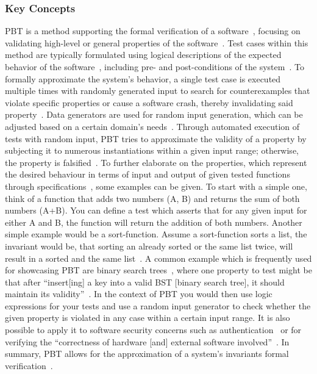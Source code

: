\documentclass[runningheads]{llncs}
\begin{document}
\subsubsection{Key Concepts}
PBT is a method supporting the formal verification of a software~\cite{Chen2022,Fink1997,Honarvar2020,Paraskevopoulou2015}, focusing on validating high-level or general properties of the software~\cite{Fink1997,Honarvar2020,Corgozinho2023}. Test cases within this method are typically formulated using logical descriptions of the expected behavior of the software~\cite{Chen2022,Fink1997,Honarvar2020,Loescher2017,Corgozinho2023}, including pre- and post-conditions of the system~\cite{Honarvar2020}. To formally approximate the system's behavior, a single test case is executed multiple times with randomly generated input to search for counterexamples that violate specific properties or cause a software crash, thereby invalidating said property~\cite{Chen2022,Loescher2017,Padhye2019,ElazarMittelman2023,Paraskevopoulou2015,Corgozinho2023}. Data generators are used for random input generation, which can be adjusted based on a certain domain's needs~\cite{Chen2022,Loescher2017,Padhye2019,ElazarMittelman2023}. Through automated execution of tests with random input, PBT tries to approximate the validity of a property by subjecting it to numerous instantiations within a given input range; otherwise, the property is falsified~\cite{Fink1997,ElazarMittelman2023,Corgozinho2023,Paraskevopoulou2015}. To further elaborate on the properties, which represent the desired behaviour in terms of input and output of given tested functions through specifications~\cite{Chen2022,Fink1997,Loescher2017}, some examples can be given. To start with a simple one, think of a function that adds two numbers (A, B) and returns the sum of both numbers (A+B). You can define a test which asserts that for any given input for either A and B, the function will return the addition of both numbers. Another simple example would be a sort-function. Assume a sort-function sorts a list, the invariant would be, that sorting an already sorted or the same list twice, will result in a sorted and the same list~\cite{Corgozinho2023}. A common example which is frequently used for showcasing PBT are binary search trees~\cite{Corgozinho2023,Shi2023}, where one property to test might be that after ``insert[ing] a key into a valid BST [binary search tree], it should maintain its validity''~\cite{Shi2023}. In the context of PBT you would then use logic expressions for your tests and use a random input generator to check whether the given property is violated in any case within a certain input range. It is also possible to apply it to software security concerns such as authentication~\cite{Fink1997} or for verifying the ``correctness of hardware [and] external software involved''~\cite{Chen2022}. In summary, PBT allows for the approximation of a system's invariants formal verification~\cite{Fink1997,ElazarMittelman2023,Corgozinho2023}.
\end{document}

